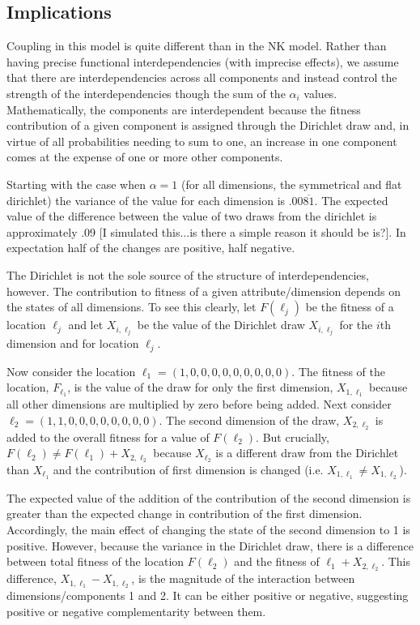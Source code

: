 \documentclass[12pt]{article}
\begin{document}
\subsection*{Implications}



Coupling in this model is quite different than in the NK model. Rather than having precise functional interdependencies (with imprecise effects), we assume that there are interdependencies across all components and instead control the strength of the interdependencies though the sum of the $\alpha_i$ values. Mathematically, the components are interdependent because the fitness contribution of a given component is assigned through the Dirichlet draw and, in virtue of all probabilities needing to sum to one, an increase in one component comes at the expense of one or more other components.

 Starting with the case when $\alpha=1$ (for all dimensions, the symmetrical and flat dirichlet) the variance of the value for each dimension is $.00\overline{81}$. The expected value of the difference between the value of two draws from the dirichlet is approximately .09 [I simulated this...is there a simple reason it should be is?]. In expectation half of the changes are positive, half negative.

The Dirichlet is not the sole source of the structure of interdependencies, however. The contribution to fitness of a given attribute/dimension depends on the states of all dimensions. To see this clearly, let $F(\ell_j)$ be the fitness of a location $\ell_j$ and let $X_{i,\ell_j}$ be the value of the Dirichlet draw $X_{i,\ell_j}$ for the $i$th dimension and for location $\ell_j$.

Now consider the location $\ell_1 = (1,0,0,0,0,0,0,0,0,0)$. The fitness of the location, $F_{\ell_1}$, is the value of the draw for only the first dimension, $X_{1,\ell_1}$ because all other dimensions are multiplied by zero before being added. Next consider $\ell_2 = (1,1,0,0,0,0,0,0,0,0)$.  The second dimension of the draw, $X_{2,\ell_2}$ is added to the overall fitness for a value of $F(\ell_2)$. But crucially, $F(\ell_2) \neq F(\ell_1) + X_{2,\ell_2}$
because $X_{\ell_2}$ is a different draw from the Dirichlet than $X_{\ell_1}$ and the contribution of first dimension is changed (i.e. $X_{1,\ell_1} \neq X_{1,\ell_2}$).

The expected value of the addition of the contribution of the second dimension is greater than the expected change in contribution of the first dimension. Accordingly, the main effect of changing the state of the second dimension to 1 is positive. However, because the variance in the Dirichlet draw, there is a difference between total fitness of the location $F(\ell_2)$ and the fitness of $\ell_1 + X_{2,\ell_2}$. This difference, $X_{1,\ell_1} - X_{1,\ell_2}$, is the magnitude of the interaction between dimensions/components 1 and 2. It can be either positive or negative, suggesting positive or negative complementarity between them.
\end{document}
